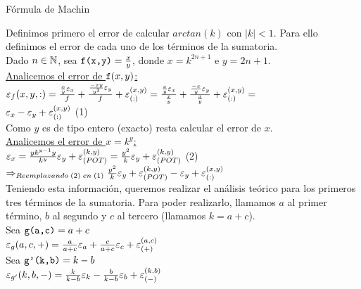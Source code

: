 \begin{section}{Fórmula de Machin}

	\large
	
	Definimos primero el error de calcular $arctan(k)$ con $|k|<1$. Para ello definimos el error de cada uno de los términos de la sumatoria.\\
	
	Dado $n \in \mathbb{N}$, sea $\texttt{f(x,y)}=\frac{x}{y}$, donde $x=k^{2n+1}$ e $y=2n+1$.\\
	
	\underline{Analicemos el error de $\texttt{f}(x,y)$:}\\
	
	$\texttt{$\varepsilon _{f}({x,y,:})$}=\frac{\frac{x}{y}\varepsilon _{x}}{f} + \frac{\frac{-xy}{y^2}\varepsilon _{y}}{f} + \varepsilon _{({:})}^{({x,y})} = 
	\frac{\frac{x}{y}\varepsilon _{x}}{\frac{x}{y}} + \frac{\frac{-x}{y}\varepsilon _{y}}{\frac{x}{y}} + \varepsilon _{({:})}^{({x,y})} =$\\
	
	$\varepsilon _{x} - \varepsilon _{y} + \varepsilon _{({:})}^{({x,y})}$ (1)\\
	
	Como $y$ es de tipo entero (exacto) resta calcular el error de $x$.\\
	
	\underline{Analicemos el error de $x=k^y$:}\\
	
	$\texttt{$\varepsilon _{x}$}=\frac{yk^{y-1}y}{k^y}\varepsilon _{y} + \varepsilon _{({POT})}^{({k,y})} = \frac{y^2}{k}\varepsilon _{y} + \varepsilon _{({POT})}^{({k,y})}$ (2)\\ 
	
	$\Rightarrow_{Reemplazando \; (2) \; en \; (1)} \frac{y^2}{k}\varepsilon _{y} + \varepsilon _{({POT})}^{({k,y})} - \varepsilon _{y} + \varepsilon _{({:})}^{({x,y})}$\\
	
	Teniendo esta información, queremos realizar el análisis teórico para los primeros tres términos de la sumatoria. Para poder realizarlo, llamamos $a$ al primer término,
	$b$ al segundo y $c$ al tercero (llamamos $k=a+c$).\\
	
	Sea $\texttt{g(a,c)}=a+c$\\
	
	$\varepsilon _{g}({a,c,+}) = \frac{a}{a+c}\varepsilon _{a} + \frac{c}{a+c}\varepsilon _{c} + \varepsilon _{({+})}^{({a,c})}$\\
	
	Sea $\texttt{g'(k,b)}=k-b$\\
	
	$\varepsilon _{g'}({k,b,-}) = \frac{k}{k-b}\varepsilon _{k} - \frac{b}{k-b}\varepsilon _{b} + \varepsilon _{({-})}^{({k,b})}$\\
	

\end{section}
